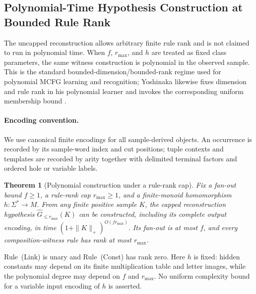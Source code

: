 \documentclass[11pt]{article}
\numberwithin{equation}{section}
\theoremstyle{plain}
\newtheorem{theorem}{Theorem}[section]
\theoremstyle{definition}
\theoremstyle{remark}
\begin{document}
\subsection{Polynomial-Time Hypothesis Construction at Bounded Rule Rank}
\label{sec:poly-time}

The uncapped reconstruction allows arbitrary finite rule rank and is not claimed
to run in polynomial time.  When $f$, $r_{\max}$, and $h$ are treated as fixed
class parameters, the same witness construction is polynomial in the observed
sample.  This is the standard bounded-dimension/bounded-rank regime used for
polynomial MCFG learning and recognition; Yoshinaka likewise fixes dimension
and rule rank in his polynomial learner and invokes the corresponding uniform
membership bound \cite[Proposition~4 and Section~4.3]{Yoshinaka2011}.

\paragraph{Encoding convention.}
We use canonical finite encodings for all sample-derived objects.  An occurrence is
recorded by its sample-word index and cut positions;
tuple contexts and templates are recorded by arity together with delimited
terminal factors and ordered hole or variable labels.

\begin{theorem}[Polynomial construction under a rule-rank cap]
\label{thm:poly}
Fix a fan-out bound \(f\ge1\), a rule-rank cap \(r_{\max}\ge1\), and a
finite-monoid homomorphism \(h:\Sigma^*\to M\).  From any finite positive
sample \(K\), the capped reconstruction hypothesis
\(\widehat G_{\le r_{\max}}(K)\)
can be constructed, including its complete output encoding, in time
\((1+\|K\|_+)^{O(f r_{\max})}.\)
Its fan-out is at most \(f\), and every composition-witness rule has rank at
most \(r_{\max}\).
\end{theorem}

Rule~(Link) is unary and Rule~(Const) has rank zero.  Here $h$ is fixed: hidden constants may depend on its finite
multiplication table and letter images, while the polynomial degree may depend
on $f$ and $r_{\max}$.  No uniform complexity bound for a variable input
encoding of $h$ is asserted.
\end{document}
